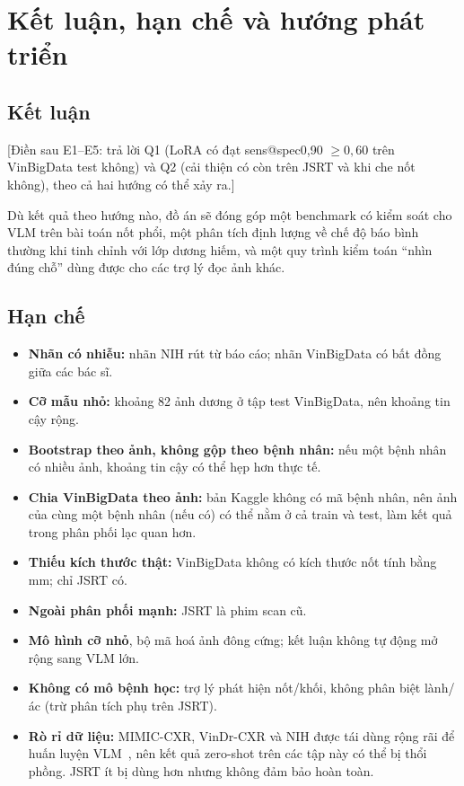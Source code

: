 \clearpage
\section{Kết luận, hạn chế và hướng phát triển}
\label{sec:conclusion}

\subsection{Kết luận}

\textcolor{badred}{[Điền sau E1--E5: trả lời Q1 (LoRA có đạt sens@spec0,90 $\ge 0{,}60$ trên VinBigData test
không) và Q2 (cải thiện có còn trên JSRT và khi che nốt không), theo cả hai hướng có thể xảy ra.]}

Dù kết quả theo hướng nào, đồ án sẽ đóng góp một benchmark có kiểm soát cho VLM trên bài toán nốt phổi, một
phân tích định lượng về chế độ báo bình thường khi tinh chỉnh với lớp dương hiếm, và một quy trình kiểm toán
``nhìn đúng chỗ'' dùng được cho các trợ lý đọc ảnh khác.

\subsection{Hạn chế}

\begin{itemize}
  \item \textbf{Nhãn có nhiễu:} nhãn NIH rút từ báo cáo; nhãn VinBigData có bất đồng giữa các bác sĩ.
  \item \textbf{Cỡ mẫu nhỏ:} khoảng 82 ảnh dương ở tập test VinBigData, nên khoảng tin cậy rộng.
  \item \textbf{Bootstrap theo ảnh, không gộp theo bệnh nhân:} nếu một bệnh nhân có nhiều ảnh, khoảng tin cậy có
        thể hẹp hơn thực tế.
  \item \textbf{Chia VinBigData theo ảnh:} bản Kaggle không có mã bệnh nhân, nên ảnh của cùng một bệnh nhân (nếu
        có) có thể nằm ở cả train và test, làm kết quả trong phân phối lạc quan hơn.
  \item \textbf{Thiếu kích thước thật:} VinBigData không có kích thước nốt tính bằng mm; chỉ JSRT có.
  \item \textbf{Ngoài phân phối mạnh:} JSRT là phim scan cũ.
  \item \textbf{Mô hình cỡ nhỏ}, bộ mã hoá ảnh đông cứng; kết luận không tự động mở rộng sang VLM lớn.
  \item \textbf{Không có mô bệnh học:} trợ lý phát hiện nốt/khối, không phân biệt lành/ác (trừ phân tích phụ trên JSRT).
  \item \textbf{Rò rỉ dữ liệu:} MIMIC-CXR, VinDr-CXR và NIH được tái dùng rộng rãi để huấn luyện
        VLM~\cite{johnson2019mimic,nguyen2025vindrvqa}, nên kết quả zero-shot trên các tập này có thể bị thổi phồng.
        JSRT ít bị dùng hơn nhưng không đảm bảo hoàn toàn.
\end{itemize}

